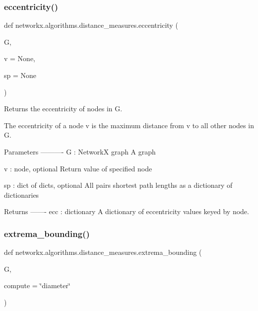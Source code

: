 \subsubsection{\texorpdfstring{eccentricity()}{eccentricity()}}
{\footnotesize\ttfamily def networkx.\+algorithms.\+distance\+\_\+measures.\+eccentricity (\begin{DoxyParamCaption}\item[{}]{G,  }\item[{}]{v = {\ttfamily None},  }\item[{}]{sp = {\ttfamily None} }\end{DoxyParamCaption})}

\begin{DoxyVerb}Returns the eccentricity of nodes in G.

The eccentricity of a node v is the maximum distance from v to
all other nodes in G.

Parameters
----------
G : NetworkX graph
   A graph

v : node, optional
   Return value of specified node

sp : dict of dicts, optional
   All pairs shortest path lengths as a dictionary of dictionaries

Returns
-------
ecc : dictionary
   A dictionary of eccentricity values keyed by node.
\end{DoxyVerb}
 \mbox{\label{namespacenetworkx_1_1algorithms_1_1distance__measures_ad6f5c3c2bbcbb92abf774214b84ddc31}} 
\subsubsection{\texorpdfstring{extrema\+\_\+bounding()}{extrema\_bounding()}}
{\footnotesize\ttfamily def networkx.\+algorithms.\+distance\+\_\+measures.\+extrema\+\_\+bounding (\begin{DoxyParamCaption}\item[{}]{G,  }\item[{}]{compute = {\ttfamily \char`\"{}diameter\char`\"{}} }\end{DoxyParamCaption})}

